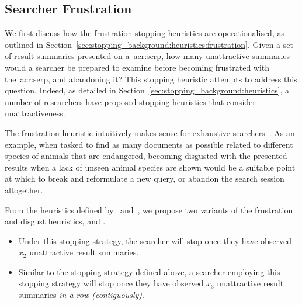 \subsection{Searcher Frustration}\label{sec:strategies:frus_disg:frustration}
We first discuss how the frustration stopping heuristics are operationalised, as outlined in Section~\ref{sec:stopping_background:heuristics:frustration}. Given a set of result summaries presented on a~\gls{acr:serp}, how many unattractive summaries would a searcher be prepared to examine before becoming frustrated with the~\gls{acr:serp}, and abandoning it? This stopping heuristic attempts to address this question. Indeed, as detailed in Section~\ref{sec:stopping_background:heuristics}, a number of researchers have proposed stopping heuristics that consider unattractiveness.

The frustration heuristic intuitively makes sense for exhaustive searchers~\citep{kraft1979stopping_rules}. As an example, when tasked to find as many documents as possible related to different species of animals that are endangered, becoming disgusted with the presented results when a lack of unseen animal species are shown would be a suitable point at which to break and reformulate a new query, or abandon the search session altogether.

From the heuristics defined by~\cite{cooper1973retrieval_effectiveness_ii} and~\cite{kraft1979stopping_rules}, we propose two variants of the frustration and disgust heuristics,  and .

\begin{itemize}
    \item{ Under this stopping strategy, the searcher will stop once they have observed $x_2$ unattractive result summaries.}
    
    \item{ Similar to the stopping strategy defined above, a searcher employing this stopping strategy will stop once they have observed $x_3$ unattractive result summaries \emph{in a row (contiguously)}.}
\end{itemize}

